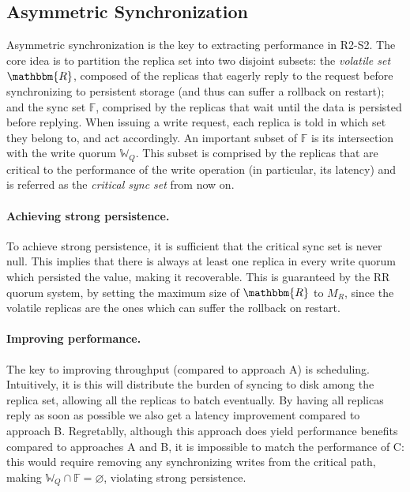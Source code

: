 \subsection{Asymmetric Synchronization}\label{ssec:asymmetric_synchronization}

Asymmetric synchronization is the key to extracting performance
in \ac{R2-S2}. The core idea is to partition the replica set
into two disjoint subsets: the \emph{volatile set}
$\mathbbm{R}$, composed of the replicas that eagerly reply to the
request before synchronizing to persistent storage (and thus can
suffer a rollback on restart); and the sync set $\mathbb{F}$,
comprised by the
replicas that wait until the data is persisted before replying.
When issuing a write request, each replica is told in which set
they belong to, and act accordingly. An important subset of
$\mathbb{F}$ is its intersection with the write quorum
$\mathbb{W}_Q$. This subset is comprised by the replicas that are
critical to the performance of the write operation (in
particular, its latency) and is referred as the \emph{critical
sync set} from now on.

\paragraph{Achieving strong persistence.} To achieve strong
persistence, it is sufficient that the critical sync set is
never null. This implies that there is always at least one
replica in every write quorum which persisted the value, making
it recoverable. This is guaranteed by the \ac{RR} quorum
system, by setting the maximum size of $\mathbbm{R}$ to $M_R$,
since the volatile replicas are the ones which can suffer the rollback on
restart.

\paragraph{Improving performance.}The key to improving throughput
(compared to approach A) is scheduling. Intuitively, it is
this will distribute the burden of syncing to disk among the
replica set, allowing all the replicas to batch eventually. By
having all replicas reply as soon as possible we also get a
latency improvement compared to approach B. Regretablly, although
this approach does yield performance benefits compared to
approaches A and B, it is impossible to match the performance of
C\@: this would require removing any synchronizing writes from the
critical path, making $\mathbb{W}_Q \cap \mathbb{F} =
\varnothing$, violating strong persistence.

